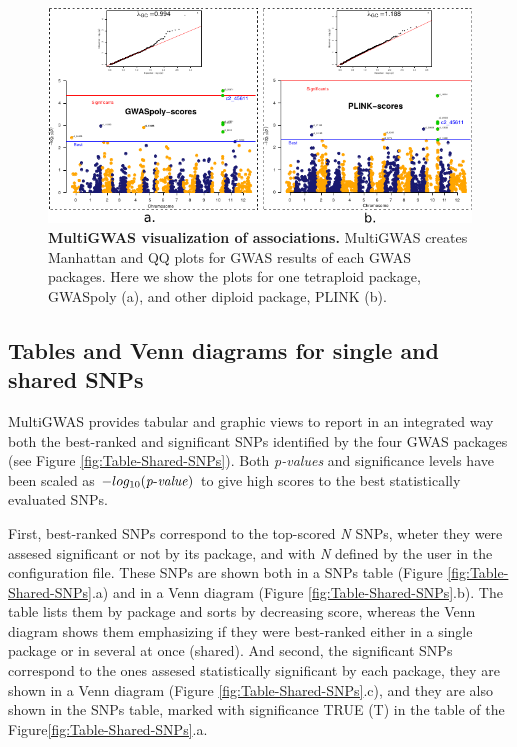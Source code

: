 \documentclass{article}
\begin{document}
\begin{figure}[H]
\noindent %
\noindent\begin{minipage}[t]{1\columnwidth}%
\begin{center}
\includegraphics{images/paper-manhattan-QQ-plots}
\par\end{center}%
\end{minipage}

\caption{\textbf{MultiGWAS visualization of associations.} MultiGWAS creates
Manhattan and QQ plots for GWAS results of each GWAS packages. Here
we show the plots for one tetraploid package, GWASpoly (a), and other
diploid package, PLINK (b). \label{fig:view-qqmanhattan}}
\end{figure}


\subsection{Tables and Venn diagrams for single and shared SNPs}

MultiGWAS provides tabular and graphic views to report in an integrated
way both the best-ranked and significant SNPs identified by the four
GWAS packages (see Figure \ref{fig:Table-Shared-SNPs}). Both \emph{p-values}
and significance levels have been scaled as $-log_{10}({\operatorname{\mathit{p-value}}})$
to give high scores to the best statistically evaluated SNPs.

First, best-ranked SNPs correspond to the top-scored \emph{N} SNPs,
wheter they were assesed significant or not by its package, and with\emph{
N} defined by the user in the configuration file. These SNPs are shown
both in a SNPs table (Figure \ref{fig:Table-Shared-SNPs}.a) and in
a Venn diagram (Figure \ref{fig:Table-Shared-SNPs}.b). The table
lists them by package and sorts by decreasing score, whereas the Venn
diagram shows them emphasizing if they were best-ranked either in
a single package or in several at once (shared). And second, the significant
SNPs correspond to the ones assesed statistically significant by each
package, they are shown in a Venn diagram (Figure \ref{fig:Table-Shared-SNPs}.c),
and they are also shown in the SNPs table, marked with significance
TRUE (T) in the table of the Figure\ref{fig:Table-Shared-SNPs}.a.
\end{document}

